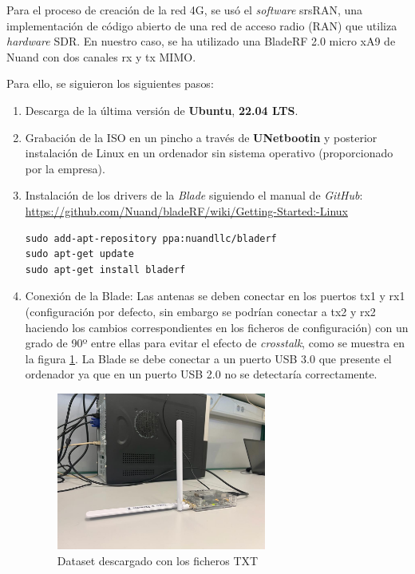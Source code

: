 Para el proceso de creación de la red 4G, se usó el \textit{software} srsRAN, una implementación de código abierto de una red de acceso radio (RAN) que utiliza \textit{hardware} SDR. En nuestro caso, se ha utilizado una BladeRF 2.0 micro xA9 de Nuand con dos canales rx y tx MIMO.

Para ello, se siguieron los siguientes pasos:


\begin{enumerate}
\item Descarga de la última versión de \textbf{Ubuntu}, \textbf{22.04 LTS}.
\item Grabación de la ISO en un pincho a través de \textbf{UNetbootin} y posterior instalación de Linux en un ordenador sin sistema operativo (proporcionado por la empresa).
\item Instalación de los drivers de la \textit{Blade} siguiendo el manual de \textit{GitHub}:\\
 \url{https://github.com/Nuand/bladeRF/wiki/Getting-Started:-Linux}

\begin{lstlisting}
sudo add-apt-repository ppa:nuandllc/bladerf
sudo apt-get update
sudo apt-get install bladerf
\end{lstlisting}

\item Conexión de la Blade: Las antenas se deben conectar en los puertos tx1 y rx1 (configuración por defecto, sin embargo se podrían conectar a tx2 y rx2 haciendo los cambios correspondientes en los ficheros de configuración) con un grado de 90º entre ellas para evitar el efecto de \textit{crosstalk}, como se muestra en la figura \ref{blade}. La Blade se debe conectar a un puerto USB 3.0 que presente el ordenador ya que en un puerto USB 2.0 no se detectaría correctamente.\\

\begin{figure}[H]
	\centering
	\includegraphics[width=0.65\textwidth]{Imagenes/AnexoI_Manual/RED/blade.jpeg}
	\caption{Dataset descargado con los ficheros TXT}
	\label{blade}
\end{figure}


\end{enumerate}
